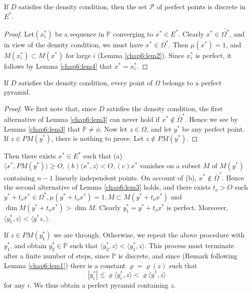 \begin{lem}\label{chap6:lem5}%
  If $D$ satisfies the density condition, then the set $\mathscr{P}$
  of perfect points is discrete in $E^*$. 
\end{lem}

\begin{proof}
  Let\pageoriginale $(x^*_i)$ be a sequence in $\mathbb{P}$ converging to $x^* \in
  E^*$. Clearly $x^* \in \bar{\Omega^*}$, and in view of the density
  condition, we must have $x^* \in \Omega^*$. Then $\mu (x^*)=1$, and
  $M(x^*_i) \subset M(x^*)$ for large $i$ (Lemma \ref{chap6:lem2}). Since $x^*_i$ is
  perfect, it follows by Lemma \ref{chap6:lem4} that $x^*=x^*_i$. 
\end{proof}

\begin{lem}\label{chap6:lem6}%
  If $D$ satisfies the density condition, every point of $\Omega$
  belongs to a perfect pyramid. 
\end{lem}

\begin{proof}
  We first note that, since $D$ satisfies the density condition, the
  first alternative of Lemma \ref{chap6:lem3} can never hold if $x^* \notin
  \bar{\Omega}^*$. Hence we see by Lemma \ref{chap6:lem3} that $\mathbb{P}\neq \phi
  $. Now let $z \in \Omega$, and let $y^*$ be any perfect point. If $z
  \in PM(y^*)$, there is nothing to prove. Let $z \notin PM(y^*)$. 
\end{proof}

Then there exists $x^* \in E^*$ such that (a) $\langle x^*,PM
(y^*)\rangle \geq O, (b) \langle x^*,z \rangle < O, (c)x^*$ vanishes
on a subset $M$ of $M(y^*)$ containing $n-1$ linearly independent
points. On account of (b), $x^* \notin \bar{\Omega}^*$. Hence the
second alternative of Lemma \ref{chap6:lem3} holds, and there exists $t_o > O$ such
$y^* +t_o x^* \in \Omega^*, \mu(y^* +t_o x^*) = 1,M \subset M(y^* +
t_o x^*)$ and $\dim M (y^* +t_o x^*) > \dim M$. Clearly $y^*_1 =y^* +
t_o x^*$ is perfect. Moreover, $\langle y^*_1,z \rangle < \langle
y^*z, \rangle$. 

If $z \in PM (y^*_1)$ we are through. Otherwise, we repeat the above
procedure with $y^*_1$, and obtain $y^*_2 \in \mathbb{P}$ such that
$\langle y^*_2,z \rangle < \langle y^*_1,z \rangle$. This process must
terminate after a finite number of steps, since $\mathbb{P}$ is
discrete, and since (Remark following Lemma \ref{chap6:lem1}) there is a constant
$\varrho = \varrho (z)$ such that 
$$
|y^*_i | \leq \varrho \langle y^*_i,z \rangle < \varrho \langle y^*,z \rangle
$$
for any $i$. We thus obtain a perfect pyramid containing $z$.

